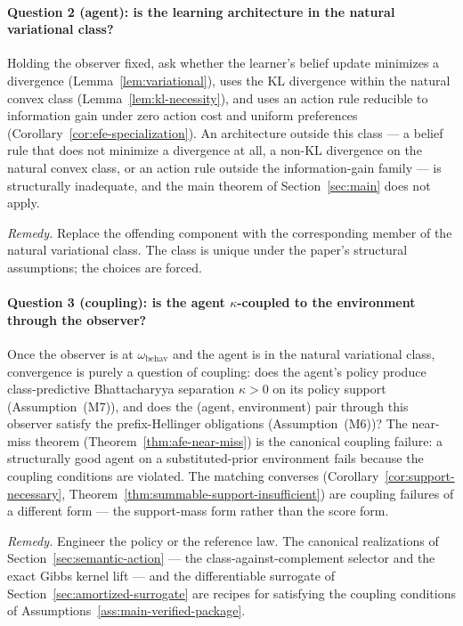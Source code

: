 \documentclass[11pt]{article}
\theoremstyle{definition}
\theoremstyle{remark}
\begin{document}
\paragraph{Question 2 (agent): is the learning architecture in the natural variational class?}
Holding the observer fixed, ask whether the learner's belief update minimizes a divergence (Lemma~\ref{lem:variational}), uses the KL divergence within the natural convex class (Lemma~\ref{lem:kl-necessity}), and uses an action rule reducible to information gain under zero action cost and uniform preferences (Corollary~\ref{cor:efe-specialization}). An architecture outside this class --- a belief rule that does not minimize a divergence at all, a non-KL divergence on the natural convex class, or an action rule outside the information-gain family --- is structurally inadequate, and the main theorem of Section~\ref{sec:main} does not apply.

\emph{Remedy.} Replace the offending component with the corresponding member of the natural variational class. The class is unique under the paper's structural assumptions; the choices are forced.

\paragraph{Question 3 (coupling): is the agent $\kappa$-coupled to the environment through the observer?}
Once the observer is at $\omega_{\mathrm{behav}}$ and the agent is in the natural variational class, convergence is purely a question of coupling: does the agent's policy produce class-predictive Bhattacharyya separation $\kappa>0$ on its policy support (Assumption~\textup{(M7)}), and does the (agent, environment) pair through this observer satisfy the prefix-Hellinger obligations (Assumption~\textup{(M6)})? The near-miss theorem (Theorem~\ref{thm:afe-near-miss}) is the canonical coupling failure: a structurally good agent on a substituted-prior environment fails because the coupling conditions are violated. The matching converses (Corollary~\ref{cor:support-necessary}, Theorem~\ref{thm:summable-support-insufficient}) are coupling failures of a different form --- the support-mass form rather than the score form.

\emph{Remedy.} Engineer the policy or the reference law. The canonical realizations of Section~\ref{sec:semantic-action} --- the class-against-complement selector and the exact Gibbs kernel lift --- and the differentiable surrogate of Section~\ref{sec:amortized-surrogate} are recipes for satisfying the coupling conditions of Assumptions~\ref{ass:main-verified-package}.
\end{document}
